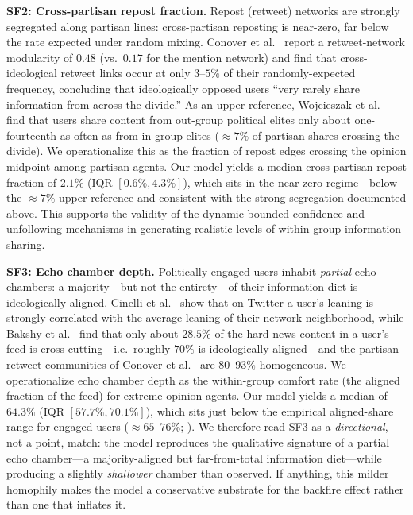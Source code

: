 \documentclass[pdflatex,sn-mathphys-num]{sn-jnl}%
\theoremstyle{thmstyleone}%
\theoremstyle{thmstyletwo}%
\theoremstyle{thmstylethree}%
\begin{document}
\noindent\textbf{SF2: Cross-partisan repost fraction.}
Repost (retweet) networks are strongly segregated along partisan lines:
cross-partisan reposting is near-zero, far below the rate expected under
random mixing. Conover et al.~\cite{Conover2011} report a retweet-network
modularity of $0.48$ (vs.\ $0.17$ for the mention network) and find that
cross-ideological retweet links occur at only $3$--$5\%$ of their
randomly-expected frequency, concluding that ideologically opposed users
``very rarely share information from across the divide.''
As an upper reference, Wojcieszak et al.~\cite{Wojcieszak2022} find that
users share content from out-group political elites only about
one-fourteenth as often as from in-group elites ($\approx 7\%$ of partisan
shares crossing the divide).
We operationalize this as the fraction of repost edges crossing the opinion
midpoint among partisan agents. Our model yields a median cross-partisan
repost fraction of $2.1\%$ (IQR $[0.6\%, 4.3\%]$), which sits in the
near-zero regime---below the $\approx 7\%$ upper reference and consistent
with the strong segregation documented above. This supports the validity of
the dynamic bounded-confidence and unfollowing mechanisms in generating
realistic levels of within-group information sharing.

\noindent\textbf{SF3: Echo chamber depth.}
Politically engaged users inhabit \emph{partial} echo chambers: a
majority---but not the entirety---of their information diet is
ideologically aligned. Cinelli et al.~\cite{Cinelli2021} show that on
Twitter a user's leaning is strongly correlated with the average leaning of
their network neighborhood, while Bakshy et al.~\cite{Bakshy2015} find that
only about $28.5\%$ of the hard-news content in a user's feed is
cross-cutting---i.e.\ roughly $70\%$ is ideologically aligned---and the
partisan retweet communities of Conover et al.~\cite{Conover2011} are
$80$--$93\%$ homogeneous. 
We operationalize echo chamber depth as the within-group comfort rate
(the aligned fraction of the feed) for extreme-opinion agents.
Our model yields a median of $64.3\%$ (IQR $[57.7\%, 70.1\%]$), which sits
just below the empirical aligned-share range for engaged users
($\approx\!65$--$76\%$; \cite{Bakshy2015}). We therefore read SF3 as a
\emph{directional}, not a point, match: the model reproduces the qualitative
signature of a partial echo chamber---a majority-aligned but far-from-total
information diet---while producing a slightly \emph{shallower} chamber than
observed. If anything, this milder homophily makes the model a conservative
substrate for the backfire effect rather than one that inflates it.
\end{document}
